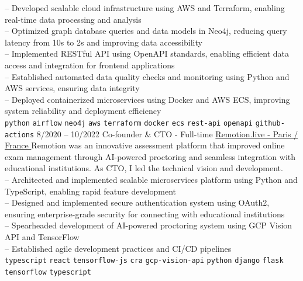 \begin{entrylist}
{        -- Developed scalable cloud infrastructure using AWS and Terraform, enabling real-time data processing and analysis \\
        -- Optimized graph database queries and data models in Neo4j, reducing query latency from 10s to 2s and improving data accessibility \\
        -- Implemented RESTful API using OpenAPI standards, enabling efficient data access and integration for frontend applications \\
        -- Established automated data quality checks and monitoring using Python and AWS services, ensuring data integrity \\
        -- Deployed containerized microservices using Docker and AWS ECS, improving system reliability and deployment efficiency \\
        \texttt{python}\slashsep
        \texttt{airflow}\slashsep
        \texttt{neo4j}\slashsep
        \texttt{aws}\slashsep
        \texttt{terraform}\slashsep
        \texttt{docker}\slashsep
        \texttt{ecs}\slashsep
        \texttt{rest-api}\slashsep
        \texttt{openapi}\slashsep
        \texttt{github-actions}\slashsep
    }
    \entry
    {8/2020 -- 10/2022}
    {Co-founder \& CTO - Full-time}
    {\href{https://remotion.live/}{Remotion.live - Paris / France }}
    {Remotion was an innovative assessment platform that improved online exam management through AI-powered proctoring and seamless integration with educational institutions. As CTO, I led the technical vision and development.\\
        -- Architected and implemented scalable microservices platform using Python and TypeScript, enabling rapid feature development \\
        -- Designed and implemented secure authentication system using OAuth2, ensuring enterprise-grade security for connecting with educational institutions \\
        -- Spearheaded development of AI-powered proctoring system using GCP Vision API and TensorFlow \\
        -- Established agile development practices and CI/CD pipelines\\
        \texttt{typescript}\slashsep
        \texttt{react}\slashsep
        \texttt{tensorflow-js}\slashsep
        \texttt{cra}\slashsep
        \texttt{gcp-vision-api}\slashsep
        \texttt{python}\slashsep
        \texttt{django}\slashsep
        \texttt{flask}\slashsep
        \texttt{tensorflow}\slashsep
        \texttt{typescript}\slashsep
}
\end{entrylist}
